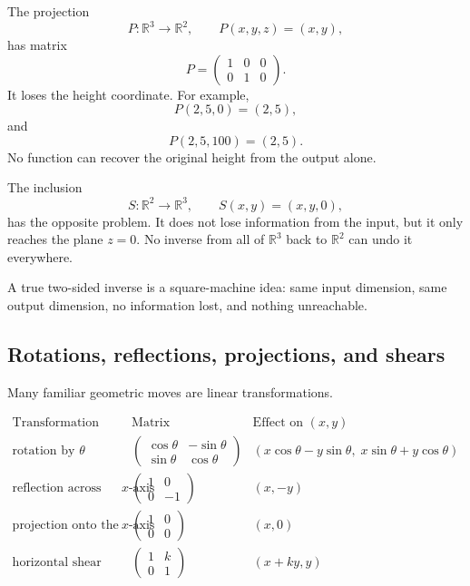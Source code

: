 \begin{example}
The projection
\[
    P:\mathbb R^3\to\mathbb R^2,
    \qquad
    P(x,y,z)=(x,y),
\]
has matrix
\[
    P=
    \begin{pmatrix}
        1&0&0\\
        0&1&0
    \end{pmatrix}.
\]
It loses the height coordinate.  For example,
\[
    P(2,5,0)=(2,5),
\]
and
\[
    P(2,5,100)=(2,5).
\]
No function can recover the original height from the output alone.

The inclusion
\[
    S:\mathbb R^2\to\mathbb R^3,
    \qquad
    S(x,y)=(x,y,0),
\]
has the opposite problem.  It does not lose information from the input, but it only reaches
the plane \(z=0\).  No inverse from all of \(\mathbb R^3\) back to \(\mathbb R^2\) can undo
it everywhere.

A true two-sided inverse is a square-machine idea: same input dimension, same output
dimension, no information lost, and nothing unreachable.
\end{example}

\subsection{Rotations, reflections, projections, and shears}

Many familiar geometric moves are linear transformations.

\[
\begin{array}{c|c|c}
\text{Transformation} & \text{Matrix} & \text{Effect on }(x,y) \\ \hline
\text{rotation by }\theta
&
\begin{pmatrix}
\cos\theta&-\sin\theta\\
\sin\theta&\cos\theta
\end{pmatrix}
&
(x\cos\theta-y\sin\theta,\;x\sin\theta+y\cos\theta)
\\[1.4em]
\text{reflection across the }x\text{-axis}
&
\begin{pmatrix}
1&0\\
0&-1
\end{pmatrix}
&
(x,-y)
\\[1.4em]
\text{projection onto the }x\text{-axis}
&
\begin{pmatrix}
1&0\\
0&0
\end{pmatrix}
&
(x,0)
\\[1.4em]
\text{horizontal shear}
&
\begin{pmatrix}
1&k\\
0&1
\end{pmatrix}
&
(x+ky,y)
\end{array}
\]

